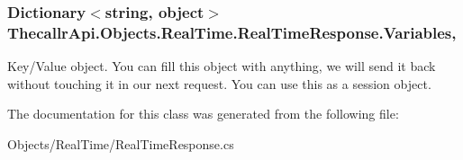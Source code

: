 \hypertarget{class_thecallr_api_1_1_objects_1_1_real_time_1_1_real_time_response_ae5b9bace436c3c3e61e9a4cc1bef8ead}{
\subsubsection[{Variables}]{\setlength{\rightskip}{0pt plus 5cm}Dictionary$<$string, object$>$ Thecallr\+Api.\+Objects.\+Real\+Time.\+Real\+Time\+Response.\+Variables\hspace{0.3cm}{\ttfamily [get]}, {\ttfamily [set]}}}\label{class_thecallr_api_1_1_objects_1_1_real_time_1_1_real_time_response_ae5b9bace436c3c3e61e9a4cc1bef8ead}


Key/\+Value object. You can fill this object with anything, we will send it back without touching it in our next request. You can use this as a session object. 



The documentation for this class was generated from the following file\+:\begin{DoxyCompactItemize}
\item 
Objects/\+Real\+Time/Real\+Time\+Response.\+cs\end{DoxyCompactItemize}
